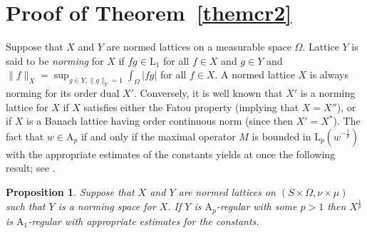 \documentclass[12pt]{amsart}
\newtheorem {proposition} [theorem] {Proposition}
\newcommand {\apclass} [1] {\ensuremath{\mathrm A_{#1}}}
\newcommand {\lclass} [2] {\ensuremath{\mathrm L_{#1} \left( #2 \right) }}
\newcommand {\lclassg} [1] {\ensuremath{\mathrm L_{#1}}}
\newcommand {\weightw} {\ensuremath {\mathit w}}
\begin{document}
\section {Proof of Theorem~\ref {themcr2}}

\label {potmcr2}

Suppose that $X$ and $Y$ are normed lattices on a measurable space $\Omega$.
Lattice $Y$ is said to be \emph {norming} for $X$
if $f g \in \lclassg {1}$ for all $f \in X$ and $g \in Y$ and
$\|f\|_X = \sup_{g \in Y, \|g\|_Y = 1} \int_{\Omega} |f g|$ for all $f \in X$.
A normed lattice $X$ is always norming for its order dual $X'$.
Conversely, it is well known that $X'$ is a norming lattice for $X$
if $X$ satisfies either the Fatou property (implying that $X = X''$), or if $X$ is a Banach lattice
having order continuous norm (since then $X' = X^*$).
The fact that $\weightw \in \apclass {p}$ if and only if the maximal operator $M$ is bounded in
$\lclass {p} {\weightw^{-\frac 1 p}}$ with the appropriate estimates of the constants
yields at once the following result; see \cite [Proposition~13] {rutsky2011en}.
\begin {proposition}
\label {aptoconj}
Suppose that $X$ and $Y$ are normed lattices on $(S \times \Omega, \nu \times \mu)$
such that $Y$ is a norming space for $X$.
If $Y$ is $\apclass {p}$-regular with some $p > 1$ then $X^{\frac 1 p}$ is $\apclass {1}$-regular with
appropriate estimates for the constants.
\end {proposition}
\end{document}
